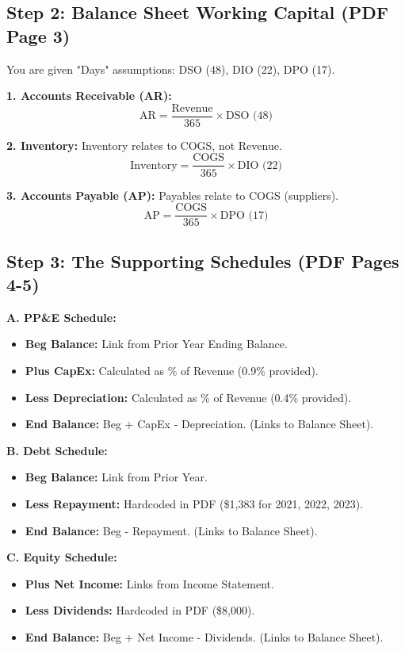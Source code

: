 \documentclass[11pt, letterpaper]{article}
\begin{document}
\subsection{Step 2: Balance Sheet Working Capital (PDF Page 3)}
You are given "Days" assumptions: DSO (48), DIO (22), DPO (17).

\textbf{1. Accounts Receivable (AR):}
\begin{equation}
    \text{AR} = \frac{\text{Revenue}}{365} \times \text{DSO (48)}
\end{equation}

\textbf{2. Inventory:}
Inventory relates to COGS, not Revenue.
\begin{equation}
    \text{Inventory} = \frac{\text{COGS}}{365} \times \text{DIO (22)}
\end{equation}

\textbf{3. Accounts Payable (AP):}
Payables relate to COGS (suppliers).
\begin{equation}
    \text{AP} = \frac{\text{COGS}}{365} \times \text{DPO (17)}
\end{equation}

\subsection{Step 3: The Supporting Schedules (PDF Pages 4-5)}

\textbf{A. PP\&E Schedule:}
\begin{itemize}
    \item \textbf{Beg Balance:} Link from Prior Year Ending Balance.
    \item \textbf{Plus CapEx:} Calculated as \% of Revenue (0.9\% provided).
    \item \textbf{Less Depreciation:} Calculated as \% of Revenue (0.4\% provided).
    \item \textbf{End Balance:} Beg + CapEx - Depreciation. (Links to Balance Sheet).
\end{itemize}

\textbf{B. Debt Schedule:}
\begin{itemize}
    \item \textbf{Beg Balance:} Link from Prior Year.
    \item \textbf{Less Repayment:} Hardcoded in PDF (\$1,383 for 2021, 2022, 2023).
    \item \textbf{End Balance:} Beg - Repayment. (Links to Balance Sheet).
\end{itemize}

\textbf{C. Equity Schedule:}
\begin{itemize}
    \item \textbf{Plus Net Income:} Links from Income Statement.
    \item \textbf{Less Dividends:} Hardcoded in PDF (\$8,000).
    \item \textbf{End Balance:} Beg + Net Income - Dividends. (Links to Balance Sheet).
\end{itemize}
\end{document}
